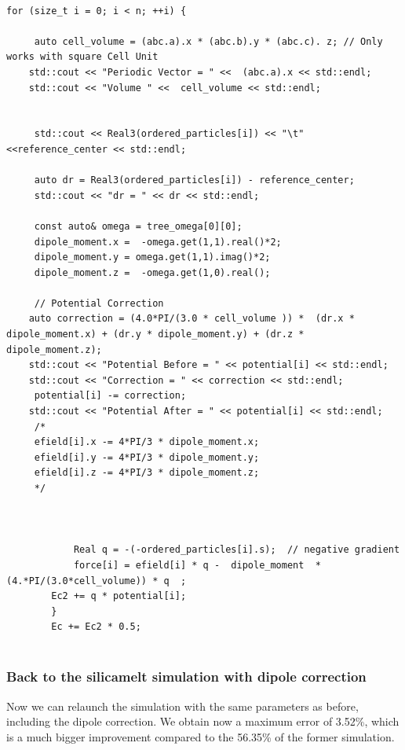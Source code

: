 \documentclass[10pt,twoside,a4paper]{report}
\begin{document}
	\begin{lstlisting}

for (size_t i = 0; i < n; ++i) {

	 auto cell_volume = (abc.a).x * (abc.b).y * (abc.c). z; // Only works with square Cell Unit
	std::cout << "Periodic Vector = " <<  (abc.a).x << std::endl;
	std::cout << "Volume " <<  cell_volume << std::endl;


	 std::cout << Real3(ordered_particles[i]) << "\t" <<reference_center << std::endl;

	 auto dr = Real3(ordered_particles[i]) - reference_center;
	 std::cout << "dr = " << dr << std::endl;

	 const auto& omega = tree_omega[0][0];
     dipole_moment.x =  -omega.get(1,1).real()*2;
	 dipole_moment.y = omega.get(1,1).imag()*2;
	 dipole_moment.z =  -omega.get(1,0).real();

	 // Potential Correction
	auto correction = (4.0*PI/(3.0 * cell_volume )) *  (dr.x * dipole_moment.x) + (dr.y * dipole_moment.y) + (dr.z * dipole_moment.z);
	std::cout << "Potential Before = " << potential[i] << std::endl;
	std::cout << "Correction = " << correction << std::endl;
	 potential[i] -= correction;
	std::cout << "Potential After = " << potential[i] << std::endl;
	 /*
	 efield[i].x -= 4*PI/3 * dipole_moment.x;
	 efield[i].y -= 4*PI/3 * dipole_moment.y;
	 efield[i].z -= 4*PI/3 * dipole_moment.z;
	 */



            Real q = -(-ordered_particles[i].s);  // negative gradient
            force[i] = efield[i] * q -  dipole_moment  * (4.*PI/(3.0*cell_volume)) * q  ;
	    Ec2 += q * potential[i];
        }
        Ec += Ec2 * 0.5;


\end{lstlisting}
	
\subsubsection{Back to the silicamelt simulation with dipole correction}

Now we can relaunch the simulation with the same parameters as before, including the dipole correction.
We obtain now a maximum error of 3.52\%, which is a much bigger improvement compared to the 56.35\% of the former simulation.
\end{document}
